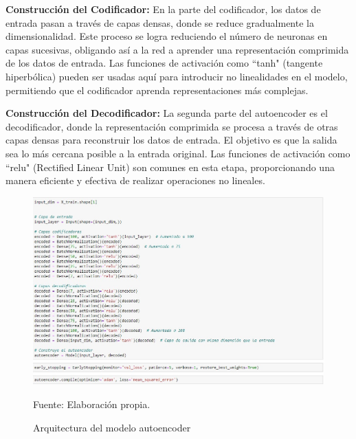 \textbf{Construcción del Codificador:} En la parte del codificador, los datos de entrada pasan a través de capas densas, donde se reduce gradualmente la dimensionalidad. Este proceso se logra reduciendo el número de neuronas en capas sucesivas, obligando así a la red a aprender una representación comprimida de los datos de entrada. Las funciones de activación como \textquotedblleft tanh" (tangente hiperbólica) pueden ser usadas aquí para introducir no linealidades en el modelo, permitiendo que el codificador aprenda representaciones más complejas.

\textbf{Construcción del Decodificador:} La segunda parte del autoencoder es el decodificador, donde la representación comprimida se procesa a través de otras capas densas para reconstruir los datos de entrada. El objetivo es que la salida sea lo más cercana posible a la entrada original. Las funciones de activación como \textquotedblleft relu" (Rectified Linear Unit) son comunes en esta etapa, proporcionando una manera eficiente y efectiva de realizar operaciones no lineales.

\begin{figure}[H]
    \begin{minipage}[t]{0.9\textwidth}
        \caption{Arquitectura del modelo autoencoder}
        \label{arquitectura_autoencoder}        
    \end{minipage}

    \vspace{10pt}

    \begin{minipage}[b]{0.99\textwidth}
        \centering
        \includegraphics[width=\textwidth]{img/Arquitectura modelo autoencoder.jpg}        
    \end{minipage}

    \begin{minipage}[t]{0.9\textwidth}
        Fuente: Elaboración propia.
    \end{minipage}
\end{figure}

